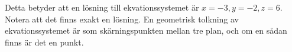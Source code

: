\documentclass[../../main.tex]{subfiles}
\begin{document}
\begin{solution}{7}
Detta betyder att en lösning till ekvationssystemet är $x = -3, y = -2, z = 6$. Notera att det finns exakt en lösning. En geometrisk tolkning av ekvationssystemet är som skärningspunkten mellan tre plan, och om en sådan finns är det en punkt.

\end{solution}
\end{document}
